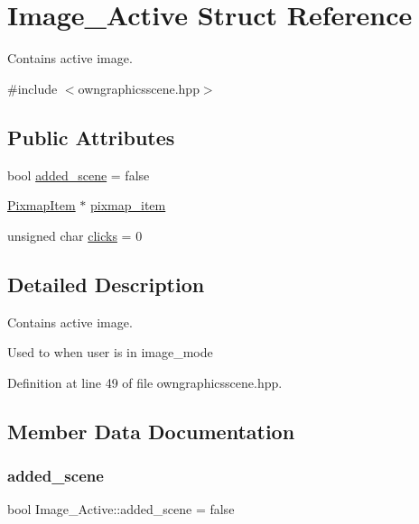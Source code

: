\hypertarget{structImage__Active}{}\section{Image\+\_\+\+Active Struct Reference}
\label{structImage__Active}


Contains active image.  




{\ttfamily \#include $<$owngraphicsscene.\+hpp$>$}

\subsection*{Public Attributes}
\begin{DoxyCompactItemize}
\item 
bool \mbox{\hyperlink{structImage__Active_ac5eb10f5ca4ad81766c92a6ede6f7853}{added\+\_\+scene}} = false
\item 
\mbox{\hyperlink{classPixmapItem}{Pixmap\+Item}} $\ast$ \mbox{\hyperlink{structImage__Active_aa007ea3c9ba4830bbc2706af51820c20}{pixmap\+\_\+item}}
\item 
unsigned char \mbox{\hyperlink{structImage__Active_abb039226daf0372a8d88c842f5eb140f}{clicks}} = 0
\end{DoxyCompactItemize}


\subsection{Detailed Description}
Contains active image. 

Used to when user is in image\+\_\+mode 

Definition at line 49 of file owngraphicsscene.\+hpp.



\subsection{Member Data Documentation}
\mbox{\label{structImage__Active_ac5eb10f5ca4ad81766c92a6ede6f7853}} 
\subsubsection{\texorpdfstring{added\+\_\+scene}{added\_scene}}
{\footnotesize\ttfamily bool Image\+\_\+\+Active\+::added\+\_\+scene = false}

